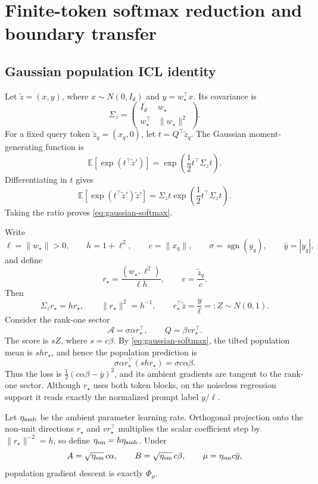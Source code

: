 \documentclass[11pt]{article}
\newcommand{\E}{\mathbb E}
\newcommand{\sgn}{\operatorname{sgn}}
\begin{document}
\section{Finite-token softmax reduction and boundary transfer}
\label{app:softmax}

\subsection{Gaussian population ICL identity}

Let \(\widetilde z=(x,y)\), where \(x\sim N(0,I_d)\) and
\(y=w_\star^\top x\).  Its covariance is
\[
\Sigma_z=
\begin{pmatrix}
I_d&w_\star\\
w_\star^\top&\|w_\star\|^2
\end{pmatrix}.
\]
For a fixed query token \(\widetilde z_q=(x_q,0)\), let
\(t=Q^\top\widetilde z_q\).  The Gaussian moment-generating function is
\[
\E[\exp(t^\top\widetilde z')]
=\exp\left(\frac12t^\top\Sigma_z t\right).
\]
Differentiating in \(t\) gives
\[
\E[\exp(t^\top\widetilde z')\widetilde z']
=\Sigma_z t\exp\left(\frac12t^\top\Sigma_z t\right).
\]
Taking the ratio proves \eqref{eq:gaussian-softmax}.

Write
\[
\ell=\|w_\star\|>0,\qquad h=1+\ell^2,\qquad
c=\|x_q\|,\qquad \sigma=\sgn(y_q),\qquad \bar y=|y_q|,
\]
and define
\[
r_\star=\frac{(w_\star,\ell^2)}{\ell h},\qquad
v=\frac{\widetilde z_q}{c}.
\]
Then
\[
\Sigma_zr_\star=hr_\star,\qquad
\|r_\star\|^2=h^{-1},\qquad
r_\star^\top\widetilde z=\frac{y}{\ell}=:Z\sim N(0,1).
\]
Consider the rank-one sector
\[
\mathcal A=\sigma\alpha r_\star^\top,\qquad
Q=\beta vr_\star^\top.
\]
The score is \(sZ\), where \(s=c\beta\).  By
\eqref{eq:gaussian-softmax}, the tilted population mean is
\(sh r_\star\), and hence the population prediction is
\[
\sigma\alpha r_\star^\top(sh r_\star)
=\sigma c\alpha\beta.
\]
Thus the loss is \(\frac12(c\alpha\beta-\bar y)^2\), and its ambient gradients
are tangent to the rank-one sector.  Although \(r_\star\) uses both token
blocks, on the noiseless regression support it reads exactly the normalized
prompt label \(y/\ell\).

Let \(\eta_{\rm amb}\) be the ambient parameter learning rate.  Orthogonal
projection onto the non-unit directions \(r_\star\) and
\(vr_\star^\top\) multiplies the scalar coefficient step by
\(\|r_\star\|^{-2}=h\), so define
\(\eta_{\rm sm}=h\eta_{\rm amb}\).  Under
\[
A=\sqrt{\eta_{\rm sm}}\,c\alpha,\qquad
B=\sqrt{\eta_{\rm sm}}\,c\beta,\qquad
\mu=\eta_{\rm sm}c\bar y,
\]
population gradient descent is exactly \(\Phi_\mu\).
\end{document}
